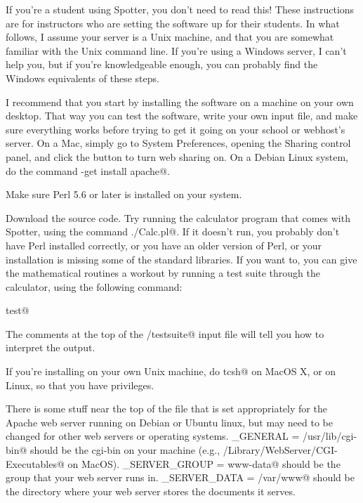 \documentclass{doc}
\begin{document}
\label{setup}

If you're a student using Spotter, you don't need to read this!
These instructions are for instructors who are setting the software
up for their students. In what follows, I assume your server is
a Unix machine, and that you are somewhat familiar with the Unix
command line. If you're using a Windows server, I can't help you,
but if you're knowledgeable enough, you can probably find the Windows
equivalents of these steps. 

I recommend that you start by installing the software on a machine
on your own desktop. That way you can test the software, write your
own input file, and make sure everything works before trying to get
it going on your school or webhost's server. On a Mac,
 simply go to System Preferences, opening the Sharing control panel,
and click the button to turn web sharing on. On a Debian Linux
system, do the command \verb@apt-get install apache@.


Make sure Perl 5.6 or later is installed on your system.

Download the
source code. Try running the
calculator program that comes with Spotter, using the command
\verb@./Calc.pl@. If it doesn't run, you probably don't have Perl
installed correctly, or you have an older version of Perl, or your
installation is missing some of the standard libraries. If you want
to, you can give the mathematical routines a workout by running
a test suite through the calculator, using the following command:

\noindent\verb@make test@

The comments at the top of the \verb@tests/testsuite@ input file will
tell you how to interpret the output.

If you're
installing on your own Unix machine, do \verb@sudo tcsh@ on MacOS X,
or \verb@su@ on Linux, 
so that you have privileges.

There is some stuff near the top of the file \verb@Makefile@ that is set appropriately
for the Apache web server running on Debian or Ubuntu linux, but may need to be changed
for other web servers or operating systems.
%
\verb@CGI_GENERAL = /usr/lib/cgi-bin@ should be the cgi-bin on your machine (e.g.,
\verb@/Library/WebServer/CGI-Executables@ on MacOS). 
%
\verb@WEB_SERVER_GROUP = www-data@ should be the group that your web server runs in.
%
\verb@WEB_SERVER_DATA = /var/www@ should be the directory where your web server stores the documents it serves.
\end{document}
